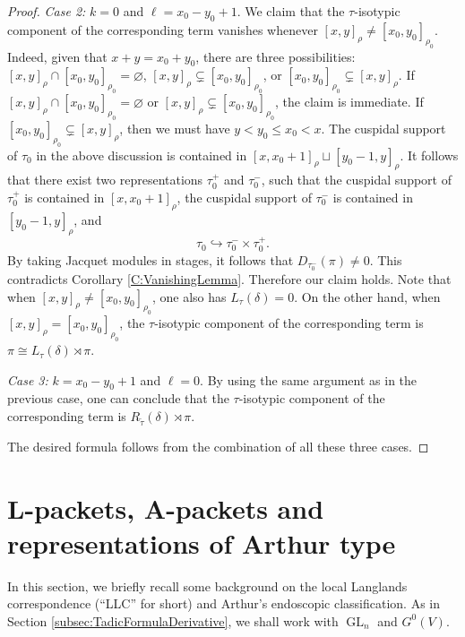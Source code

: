 \documentclass[11pt,letterpaper]{amsart}
\theoremstyle{plain}
\numberwithin{theorem}{section}
\numberwithin{equation}{subsection}
\theoremstyle{remark}
\newcommand{\GL}{\operatorname{GL}}
\begin{document}
\begin{proof}
\textit{Case 2:} $k=0$ and $\ell=x_0-y_0+1$. We claim that the $\tau$-isotypic component of the corresponding term vanishes whenever $[x,y]_\rho\neq [x_0,y_0]_{\rho_0}$. Indeed, given that $x+y=x_0+y_0$, there are three possibilities: $[x,y]_\rho\cap [x_0,y_0]_{\rho_0}=\varnothing$, $[x,y]_\rho\subsetneq [x_0,y_0]_{\rho_0}$, or $[x_0,y_0]_{\rho_0}\subsetneq [x,y]_\rho$. If $[x,y]_\rho\cap [x_0,y_0]_{\rho_0}=\varnothing$ or $[x,y]_\rho\subsetneq [x_0,y_0]_{\rho_0}$, the claim is immediate. If $[x_0,y_0]_{\rho_0}\subsetneq [x,y]_\rho$, then we must have $y<y_0\leq x_0<x$. The cuspidal support of $\tau_0$ in the above discussion is contained in $[x,x_0+1]_\rho\sqcup[y_0-1,y]_\rho$. It follows that there exist two representations $\tau_0^+$ and $\tau_0^-$, such that the cuspidal support of $\tau_0^+$ is contained in $[x,x_0+1]_\rho$, the cuspidal support of $\tau_0^-$ is contained in $[y_0-1,y]_\rho$, and
\[
    \tau_0 \hookrightarrow \tau_0^- \times \tau_0^+.
\]
By taking Jacquet modules in stages, it follows that $D_{\tau_0^-}(\pi)\neq 0$. This contradicts Corollary \ref{C:VanishingLemma}. Therefore our claim holds. Note that when $[x,y]_\rho\neq [x_0,y_0]_{\rho_0}$, one also has $L_\tau(\delta)=0$. On the other hand, when $[x,y]_\rho = [x_0,y_0]_{\rho_0}$, the $\tau$-isotypic component of the corresponding term is $\pi\cong L_\tau(\delta)\rtimes \pi$.

\vskip 5pt

\textit{Case 3:} $k=x_0-y_0+1$ and $\ell=0$. By using the same argument as in the previous case, one can conclude that the $\tau$-isotypic component of the corresponding term is $R_{\widetilde{\tau}}\left(\delta\right)\rtimes\pi$.

\vskip 5pt

The desired formula follows from the combination of all these three cases.

\end{proof}

\vskip 10pt


\section{L-packets, A-packets and representations of Arthur type} %
\label{sec:l_packets_a_packets_and_representations_of_arthur_type}

In this section, we briefly recall some background on the local Langlands correspondence (``LLC'' for short) and Arthur's endoscopic classification. As in Section \ref{subsec:TadicFormulaDerivative}, we shall work with $\GL_n$ and $G^0(V)$.
\end{document}
